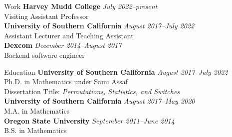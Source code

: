 \documentclass{cv} %
\begin{document}

\begin{rSection}{Work}
  \textbf{Harvey Mudd College} \hfill {\em July 2022--present}
  \\ Visiting Assistant Professor
  \\
  \textbf{University of Southern California} \hfill {\em August 2017--July 2022}
  \\ Assistant Lecturer and Teaching Assistant
  \\ \textbf{Dexcom} \hfill {\em December 2014--August 2017}
  \\ Backend software engineer
\end{rSection}

\begin{rSection}{Education}
  \textbf{University of Southern California} \hfill {\em August 2017--July 2022}
  \\ Ph.D. in Mathematics under Sami Assaf
  \\ Dissertation Title: \textit{Permutations, Statistics, and Switches}
  \\
  \textbf{University of Southern California} \hfill {\em August 2017--May 2020}
  \\ M.A. in Mathematics
  \\
  \textbf{Oregon State University} \hfill {\em September 2011--June 2014}
  \\ B.S. in Mathematics
\end{rSection}
\end{document}
